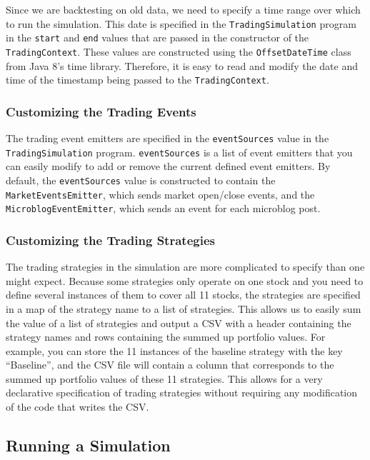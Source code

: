 Since we are backtesting on old data, we need to specify a time range over which to run the simulation.
This date is specified in the \texttt{TradingSimulation} program in the \texttt{start} and \texttt{end} values that are passed in the constructor of the \texttt{TradingContext}.
These values are constructed using the \texttt{OffsetDateTime} class from Java 8's time library.
Therefore, it is easy to read and modify the date and time of the timestamp being passed to the \texttt{TradingContext}.

\subsubsection{Customizing the Trading Events}

The trading event emitters are specified in the \texttt{eventSources} value in the \texttt{TradingSimulation} program.
\texttt{eventSources} is a list of event emitters that you can easily modify to add or remove the current defined event emitters.
By default, the \texttt{eventSources} value is constructed to contain the \texttt{MarketEventsEmitter}, which sends market open/close events, and the \texttt{MicroblogEventEmitter}, which sends an event for each microblog post.

\subsubsection{Customizing the Trading Strategies}

The trading strategies in the simulation are more complicated to specify than one might expect.
Because some strategies only operate on one stock and you need to define several instances of them to cover all 11 stocks, the strategies are specified in a map of the strategy name to a list of strategies.
This allows us to easily sum the value of a list of strategies and output a CSV with a header containing the strategy names and rows containing the summed up portfolio values.
For example, you can store the 11 instances of the baseline strategy with the key ``Baseline'', and the CSV file will contain a column that corresponds to the summed up portfolio values of these 11 strategies.
This allows for a very declarative specification of trading strategies without requiring any modification of the code that writes the CSV.

\subsection{Running a Simulation}

